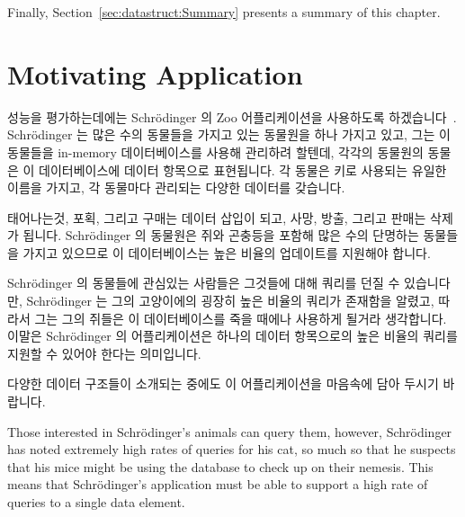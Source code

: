 Finally, Section~\ref{sec:datastruct:Summary}
presents a summary of this chapter.
\fi

\section{Motivating Application}
\label{sec:datastruct:Motivating Application}

성능을 평가하는데에는 Schr\"odinger 의 Zoo 어플리케이션을 사용하도록
하겠습니다~\cite{McKenney:2013:SDS:2483852.2483867}.
Schr\"odinger 는 많은 수의 동물들을 가지고 있는 동물원을 하나 가지고 있고, 그는
이 동물들을 in-memory 데이터베이스를 사용해 관리하려 할텐데, 각각의 동물원의
동물은 이 데이터베이스에 데이터 항목으로 표현됩니다.
각 동물은 키로 사용되는 유일한 이름을 가지고, 각 동물마다 관리되는 다양한
데이터를 갖습니다.

태어나는것, 포획, 그리고 구매는 데이터 삽입이 되고, 사망, 방출, 그리고 판매는
삭제가 됩니다.
Schr\"odinger 의 동물원은 쥐와 곤충등을 포함해 많은 수의 단명하는 동물들을
가지고 있으므로 이 데이터베이스는 높은 비율의 업데이트를 지원해야 합니다.

Schr\"odinger 의 동물들에 관심있는 사람들은 그것들에 대해 쿼리를 던질 수
있습니다만, Schr\"odinger 는 그의 고양이에의 굉장히 높은 비율의 쿼리가 존재함을
알렸고, 따라서 그는 그의 쥐들은 이 데이터베이스를 죽을 때에나 사용하게 될거라
생각합니다.
이말은 Schr\"odinger 의 어플리케이션은 하나의 데이터 항목으로의 높은 비율의
쿼리를 지원할 수 있어야 한다는 의미입니다.

다양한 데이터 구조들이 소개되는 중에도 이 어플리케이션을 마음속에 담아 두시기
바랍니다.
\iffalse

Those interested in Schr\"odinger's animals can query them, however,
Schr\"odinger has noted extremely high rates of queries for his cat,
so much so that he suspects that his mice might be using the database
to check up on their nemesis.
This means that Schr\"odinger's application must be able to support a
high rate of queries to a single data element.

